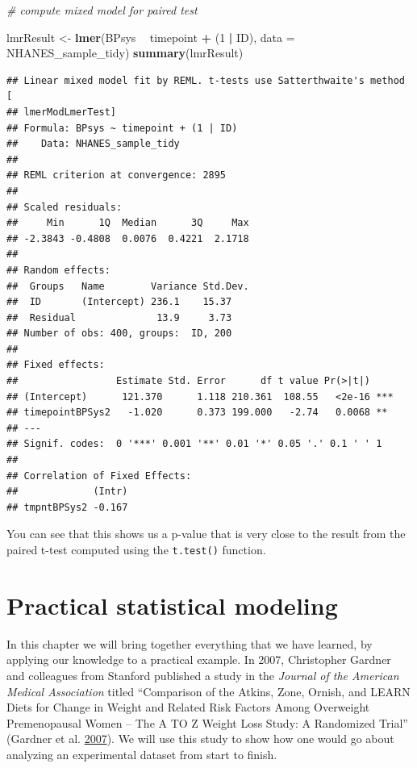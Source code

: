 \documentclass[12pt,]{book}
\newenvironment{Shaded}{\begin{snugshade}}{\end{snugshade}}
\newcommand{\CommentTok}[1]{\textcolor[rgb]{0.56,0.35,0.01}{\textit{#1}}}
\newcommand{\DataTypeTok}[1]{\textcolor[rgb]{0.13,0.29,0.53}{#1}}
\newcommand{\DecValTok}[1]{\textcolor[rgb]{0.00,0.00,0.81}{#1}}
\newcommand{\KeywordTok}[1]{\textcolor[rgb]{0.13,0.29,0.53}{\textbf{#1}}}
\newcommand{\NormalTok}[1]{#1}
\newcommand{\OperatorTok}[1]{\textcolor[rgb]{0.81,0.36,0.00}{\textbf{#1}}}
\newcommand{\StringTok}[1]{\textcolor[rgb]{0.31,0.60,0.02}{#1}}
\theoremstyle{definition}
\theoremstyle{definition}
\theoremstyle{definition}
\theoremstyle{remark}
\begin{document}
\begin{Shaded}
\begin{Highlighting}[]
\CommentTok{# compute mixed model for paired test}

\NormalTok{lmrResult <-}\StringTok{ }\KeywordTok{lmer}\NormalTok{(BPsys }\OperatorTok{~}\StringTok{ }\NormalTok{timepoint }\OperatorTok{+}\StringTok{ }\NormalTok{(}\DecValTok{1} \OperatorTok{|}\StringTok{ }\NormalTok{ID), }
                  \DataTypeTok{data =}\NormalTok{ NHANES_sample_tidy)}
\KeywordTok{summary}\NormalTok{(lmrResult)}
\end{Highlighting}
\end{Shaded}

\begin{verbatim}
## Linear mixed model fit by REML. t-tests use Satterthwaite's method [
## lmerModLmerTest]
## Formula: BPsys ~ timepoint + (1 | ID)
##    Data: NHANES_sample_tidy
## 
## REML criterion at convergence: 2895
## 
## Scaled residuals: 
##     Min      1Q  Median      3Q     Max 
## -2.3843 -0.4808  0.0076  0.4221  2.1718 
## 
## Random effects:
##  Groups   Name        Variance Std.Dev.
##  ID       (Intercept) 236.1    15.37   
##  Residual              13.9     3.73   
## Number of obs: 400, groups:  ID, 200
## 
## Fixed effects:
##                 Estimate Std. Error      df t value Pr(>|t|)    
## (Intercept)      121.370      1.118 210.361  108.55   <2e-16 ***
## timepointBPSys2   -1.020      0.373 199.000   -2.74   0.0068 ** 
## ---
## Signif. codes:  0 '***' 0.001 '**' 0.01 '*' 0.05 '.' 0.1 ' ' 1
## 
## Correlation of Fixed Effects:
##             (Intr)
## tmpntBPSys2 -0.167
\end{verbatim}

You can see that this shows us a p-value that is very close to the result from the paired t-test computed using the \texttt{t.test()} function.

\hypertarget{practical-example}{%
\chapter{Practical statistical modeling}\label{practical-example}}

In this chapter we will bring together everything that we have learned, by applying our knowledge to a practical example. In 2007, Christopher Gardner and colleagues from Stanford published a study in the \emph{Journal of the American Medical Association} titled ``Comparison of the Atkins, Zone, Ornish, and LEARN Diets for Change in Weight and Related Risk Factors Among Overweight Premenopausal Women -- The A TO Z Weight Loss Study: A Randomized Trial'' (Gardner et al. \protect\hyperlink{ref-gard:kiaz:alha:2007}{2007}). We will use this study to show how one would go about analyzing an experimental dataset from start to finish.
\end{document}
